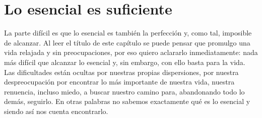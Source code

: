 \chapter{Lo esencial es suficiente}


La parte difícil es que lo esencial es también la perfección y, como tal, imposible de alcanzar. Al leer el título de este capítulo se puede pensar que promulgo una vida relajada y sin preocupaciones, por eso quiero aclararlo inmediatamente: nada más difícil que alcanzar lo esencial y, sin embargo, con ello basta para la vida. Las dificultades están ocultas por nuestras propias dispersiones, por nuestra despreocupación por encontrar lo más importante de nuestra vida, nuestra renuencia, incluso miedo, a buscar nuestro camino para, abandonando todo lo demás, seguirlo. En otras palabras no sabemos exactamente qué es lo esencial y siendo así nos cuenta encontrarlo.


\lipsum

%
